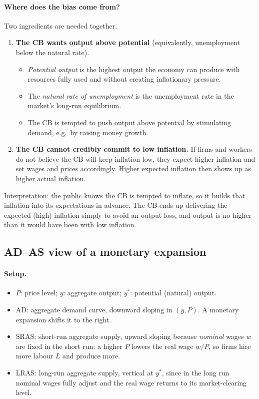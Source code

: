 \paragraph{Where does the bias come from?} Two ingredients are needed together.
\begin{enumerate}
  \item \textbf{The CB wants output above potential} (equivalently, unemployment below the natural rate).
  \begin{itemize}
    \item \emph{Potential output} is the highest output the economy can produce with resources fully used and without creating inflationary pressure.
    \item The \emph{natural rate of unemployment} is the unemployment rate in the market's long-run equilibrium.
    \item The CB is tempted to push output above potential by stimulating demand, e.g.\ by raising money growth.
  \end{itemize}
  \item \textbf{The CB cannot credibly commit to low inflation.} If firms and workers do not believe the CB will keep inflation low, they expect higher inflation and set wages and prices accordingly. Higher expected inflation then shows up as higher actual inflation.
\end{enumerate}
Interpretation: the public knows the CB is tempted to inflate, so it builds that inflation into its expectations in advance. The CB ends up delivering the expected (high) inflation simply to avoid an output loss, and output is no higher than it would have been with low inflation.

\subsection{AD--AS view of a monetary expansion }

\paragraph{Setup.}
\begin{itemize}
  \item $P$: price level; $y$: aggregate output; $y^*$: potential (natural) output.
  \item AD: aggregate demand curve, downward sloping in $(y,P)$. A monetary expansion shifts it to the right.
  \item SRAS: short-run aggregate supply, upward sloping because \emph{nominal} wages $w$ are fixed in the short run: a higher $P$ lowers the real wage $w/P$, so firms hire more labour $L$ and produce more.
  \item LRAS: long-run aggregate supply, vertical at $y^*$, since in the long run nominal wages fully adjust and the real wage returns to its market-clearing level.
\end{itemize}

